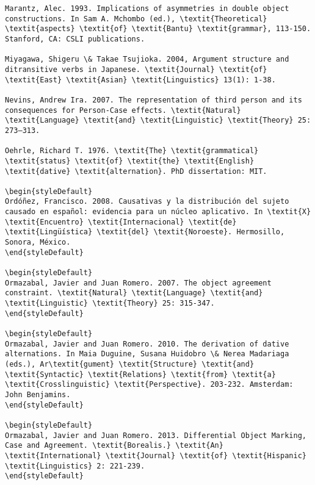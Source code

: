 \documentclass[output=paper,modfonts,nonflat]{langsci/langscibook}
\begin{document}
\begin{verbatim}
Marantz, Alec. 1993. Implications of asymmetries in double object constructions. In Sam A. Mchombo (ed.), \textit{Theoretical} \textit{aspects} \textit{of} \textit{Bantu} \textit{grammar}, 113-150. Stanford, CA: CSLI publications. 

Miyagawa, Shigeru \& Takae Tsujioka. 2004, Argument structure and ditransitive verbs in Japanese. \textit{Journal} \textit{of} \textit{East} \textit{Asian} \textit{Linguistics} 13(1): 1-38.

Nevins, Andrew Ira. 2007. The representation of third person and its consequences for Person-Case effects. \textit{Natural} \textit{Language} \textit{and} \textit{Linguistic} \textit{Theory} 25: 273–313.

Oehrle, Richard T. 1976. \textit{The} \textit{grammatical} \textit{status} \textit{of} \textit{the} \textit{English} \textit{dative} \textit{alternation}. PhD dissertation: MIT.

\begin{styleDefault}
Ordóñez, Francisco. 2008. Causativas y la distribución del sujeto causado en español: evidencia para un núcleo aplicativo. In \textit{X} \textit{Encuentro} \textit{Internacional} \textit{de} \textit{Lingüística} \textit{del} \textit{Noroeste}. Hermosillo, Sonora, México.
\end{styleDefault}

\begin{styleDefault}
Ormazabal, Javier and Juan Romero. 2007. The object agreement constraint. \textit{Natural} \textit{Language} \textit{and} \textit{Linguistic} \textit{Theory} 25: 315-347. 
\end{styleDefault}

\begin{styleDefault}
Ormazabal, Javier and Juan Romero. 2010. The derivation of dative alternations. In Maia Duguine, Susana Huidobro \& Nerea Madariaga (eds.), Ar\textit{gument} \textit{Structure} \textit{and} \textit{Syntactic} \textit{Relations} \textit{from} \textit{a} \textit{Crosslinguistic} \textit{Perspective}. 203-232. Amsterdam: John Benjamins. 
\end{styleDefault}

\begin{styleDefault}
Ormazabal, Javier and Juan Romero. 2013. Differential Object Marking, Case and Agreement. \textit{Borealis.} \textit{An} \textit{International} \textit{Journal} \textit{of} \textit{Hispanic} \textit{Linguistics} 2: 221-239.
\end{styleDefault}


\end{verbatim}
\end{document}
